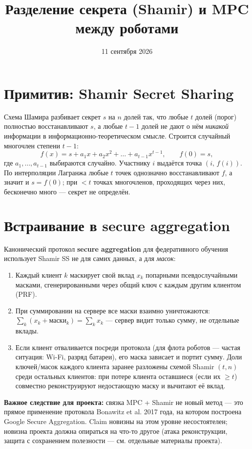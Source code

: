 \documentclass[11pt]{article}
\title{Разделение секрета (Shamir) и MPC между роботами}
\author{}
\date{11 сентября 2026}
\begin{document}
\maketitle

\section{Примитив: Shamir Secret Sharing}

Схема Шамира \cite{shamir1979} разбивает секрет $s$ на $n$ долей так, что любые $t$
долей (порог) полностью восстанавливают $s$, а любые $t-1$ долей не дают о нём
\emph{никакой} информации в информационно-теоретическом смысле. Строится случайный
многочлен степени $t-1$:
\[
  f(x) = s + a_1 x + a_2 x^2 + \dots + a_{t-1} x^{t-1}, \qquad f(0) = s,
\]
где $a_1,\dots,a_{t-1}$ выбираются случайно. Участнику $i$ выдаётся точка
$(i,\,f(i))$. По интерполяции Лагранжа любые $t$ точек однозначно восстанавливают
$f$, а значит и $s = f(0)$; при $< t$ точках многочленов, проходящих через них,
бесконечно много — секрет не определён.

\section{Встраивание в secure aggregation}

Канонический протокол \textbf{secure aggregation} для федеративного обучения
\cite{bonawitz2017} использует Shamir SS не для самих данных, а для \emph{масок}:
\begin{enumerate}
  \item Каждый клиент $k$ маскирует свой вклад $x_k$ попарными псевдослучайными
        масками, сгенерированными через общий ключ с каждым другим клиентом (PRF).
  \item При суммировании на сервере все маски взаимно уничтожаются:
        $\sum_k (x_k + \text{маски}_k) = \sum_k x_k$ — сервер видит только сумму,
        не отдельные вклады.
  \item Если клиент отваливается посреди протокола (для флота роботов —
        частая ситуация: Wi-Fi, разряд батареи), его маска \guillemotleft
        зависает\guillemotright{} и портит сумму. Доли ключей/масок каждого клиента
        заранее разложены схемой Shamir $(t, n)$ среди остальных клиентов: при потере
        клиента оставшиеся (если их $\ge t$) совместно реконструируют недостающую
        маску и вычитают её вклад.
\end{enumerate}

\textbf{Важное следствие для проекта:} связка \guillemotleft MPC + Shamir\guillemotright{}
не новый метод — это прямое применение протокола Bonawitz et al. 2017 года, на
котором построена Google Secure Aggregation. Claim новизны на этом уровне
несостоятелен; новизна проекта должна опираться на что-то другое (атака
реконструкции, защита с сохранением полезности — см. отдельные материалы проекта).
\end{document}
